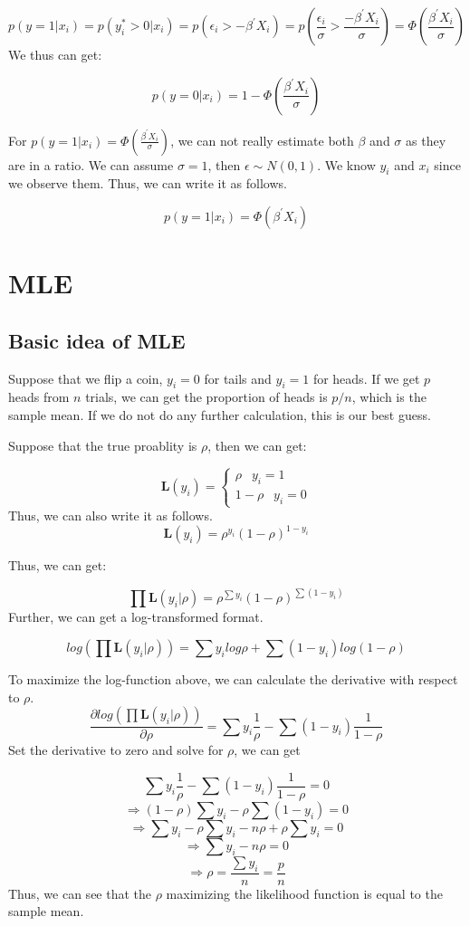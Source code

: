 \documentclass[]{book}
\begin{document}
\[p(y=1|x_i)= p(y_i^* >0|x_i)=p(\epsilon_i > -\beta^{'}X_i)= p(\frac{ \epsilon_i}{\sigma}>\frac{-\beta^{'}X_i}{\sigma})=\Phi(\frac{\beta^{'}X_i}{\sigma}) \]
We thus can get:

\[p(y=0|x_i)=1-\Phi(\frac{\beta^{'}X_i}{\sigma})\]

For \(p(y=1|x_i)=\Phi(\frac{\beta^{'}X_i}{\sigma})\), we can not really
estimate both \(\beta\) and \(\sigma\) as they are in a ratio. We can
assume \(\sigma =1\), then \(\epsilon \sim N(0,1)\). We know \(y_i\) and
\(x_i\) since we observe them. Thus, we can write it as follows.

\[p(y=1|x_i)=\Phi(\beta^{'}X_i)\]

\chapter{MLE}\label{intro}

\section{Basic idea of MLE}\label{basic-idea-of-mle}

Suppose that we flip a coin, \(y_i=0\) for tails and \(y_i=1\) for
heads. If we get \(p\) heads from \(n\) trials, we can get the
proportion of heads is \(p/n\), which is the sample mean. If we do not
do any further calculation, this is our best guess.

Suppose that the true proablity is \(\rho\), then we can get:

\[
\mathbf{L}(y_i)=\begin{cases} \rho \;\;\:   y_i = 1 \\ 1-\rho \;\;\:  y_i = 0 \end{cases}
\] Thus, we can also write it as follows.
\[\mathbf{L}(y_i) = \rho^{y_i}(1-\rho)^{1-y_i}\]

Thus, we can get:

\[\prod \mathbf{L}(y_i|\rho)=\rho^{\sum y_i}(1-\rho)^{\sum(1-y_i)}\]
Further, we can get a log-transformed format.

\[log (\prod \mathbf{L}(y_i|\rho))=\sum y_i log \rho + \sum(1-y_i) log(1-\rho)\]

To maximize the log-function above, we can calculate the derivative with
respect to \(\rho\).
\[\frac{\partial log (\prod \mathbf{L}(y_i|\rho)) }{\partial \rho}=\sum y_i \frac{1}{\rho}-\sum(1-y_i) \frac{1}{1-\rho}\]
Set the derivative to zero and solve for \(\rho\), we can get

\[\sum y_i \frac{1}{\rho}-\sum(1-y_i) \frac{1}{1-\rho}=0\]
\[\Rightarrow (1-\rho)\sum y_i - \rho \sum(1-y_i) =0\]
\[\Rightarrow \sum y_i-\rho\sum y_i - n\rho +\rho\sum y_i =0\]
\[\Rightarrow \sum y_i - n\rho  =0\]
\[\Rightarrow \rho  = \frac{\sum y_i}{n}=\frac{p}{n}\] Thus, we can see
that the \(\rho\) maximizing the likelihood function is equal to the
sample mean.
\end{document}
